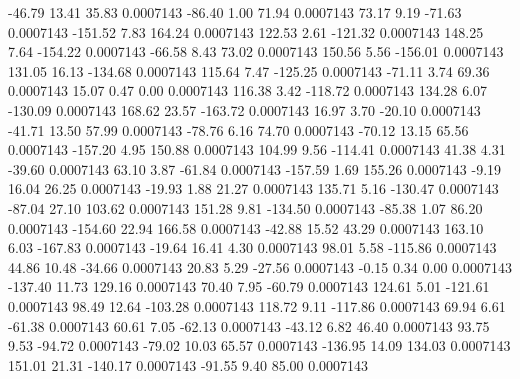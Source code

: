       -46.79       13.41       35.83     0.0007143
      -86.40        1.00       71.94     0.0007143
       73.17        9.19      -71.63     0.0007143
     -151.52        7.83      164.24     0.0007143
      122.53        2.61     -121.32     0.0007143
      148.25        7.64     -154.22     0.0007143
      -66.58        8.43       73.02     0.0007143
      150.56        5.56     -156.01     0.0007143
      131.05       16.13     -134.68     0.0007143
      115.64        7.47     -125.25     0.0007143
      -71.11        3.74       69.36     0.0007143
       15.07        0.47        0.00     0.0007143
      116.38        3.42     -118.72     0.0007143
      134.28        6.07     -130.09     0.0007143
      168.62       23.57     -163.72     0.0007143
       16.97        3.70      -20.10     0.0007143
      -41.71       13.50       57.99     0.0007143
      -78.76        6.16       74.70     0.0007143
      -70.12       13.15       65.56     0.0007143
     -157.20        4.95      150.88     0.0007143
      104.99        9.56     -114.41     0.0007143
       41.38        4.31      -39.60     0.0007143
       63.10        3.87      -61.84     0.0007143
     -157.59        1.69      155.26     0.0007143
       -9.19       16.04       26.25     0.0007143
      -19.93        1.88       21.27     0.0007143
      135.71        5.16     -130.47     0.0007143
      -87.04       27.10      103.62     0.0007143
      151.28        9.81     -134.50     0.0007143
      -85.38        1.07       86.20     0.0007143
     -154.60       22.94      166.58     0.0007143
      -42.88       15.52       43.29     0.0007143
      163.10        6.03     -167.83     0.0007143
      -19.64       16.41        4.30     0.0007143
       98.01        5.58     -115.86     0.0007143
       44.86       10.48      -34.66     0.0007143
       20.83        5.29      -27.56     0.0007143
       -0.15        0.34        0.00     0.0007143
     -137.40       11.73      129.16     0.0007143
       70.40        7.95      -60.79     0.0007143
      124.61        5.01     -121.61     0.0007143
       98.49       12.64     -103.28     0.0007143
      118.72        9.11     -117.86     0.0007143
       69.94        6.61      -61.38     0.0007143
       60.61        7.05      -62.13     0.0007143
      -43.12        6.82       46.40     0.0007143
       93.75        9.53      -94.72     0.0007143
      -79.02       10.03       65.57     0.0007143
     -136.95       14.09      134.03     0.0007143
      151.01       21.31     -140.17     0.0007143
      -91.55        9.40       85.00     0.0007143
